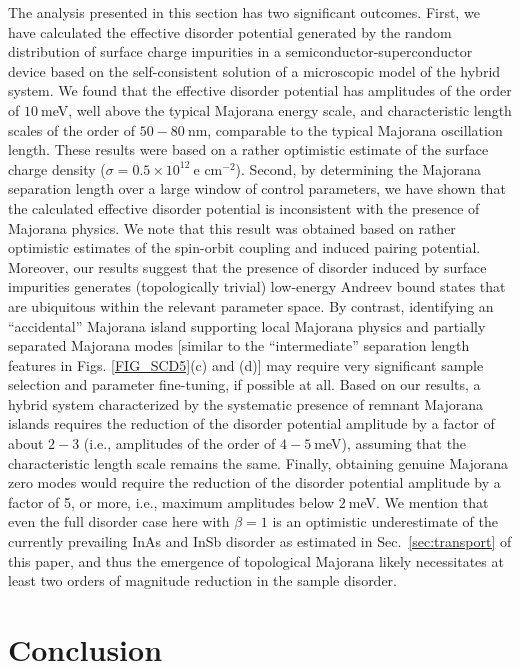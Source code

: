 \documentclass[aps,prmaterials,twocolumn,superscriptaddress,longbibliography]{revtex4-2}
\begin{document}
The analysis presented in this section has two significant outcomes. First, we have calculated the effective disorder potential generated by the random distribution of surface charge impurities in a semiconductor-superconductor device based on the self-consistent solution of a microscopic model of the hybrid system. We found that the effective disorder potential has amplitudes of the order of $10~$meV, well above the typical Majorana energy scale, and characteristic length scales of the order of $50-80~$nm, comparable to the typical Majorana oscillation length. These results were based on a rather optimistic estimate of the surface charge density ($\sigma = 0.5 \times 10^{12}~\text{e cm}^{-2}$). Second, by determining the Majorana separation length over a large window of control parameters, we have shown that the calculated effective disorder potential is inconsistent with the presence of Majorana physics. We note that this result was obtained based on rather optimistic estimates of the spin-orbit coupling and induced pairing potential. Moreover, our results suggest that the presence of disorder induced by surface impurities generates (topologically trivial) low-energy Andreev bound states that are ubiquitous within the relevant parameter space. By contrast, identifying an ``accidental'' Majorana island supporting local Majorana physics and partially separated Majorana modes [similar to the ``intermediate'' separation length features in Figs. \ref{FIG_SCD5}(c) and (d)] may require very significant sample selection and parameter fine-tuning, if possible at all. Based on our results, a hybrid system characterized by the systematic presence of remnant Majorana islands requires the reduction of the disorder potential amplitude by a factor of about $2-3$ (i.e., amplitudes of the order of $4-5~$meV), assuming that the characteristic length scale remains the same. Finally, obtaining genuine Majorana zero modes would require the reduction of the disorder potential amplitude by a factor of 5, or more, i.e., maximum amplitudes below $2~$meV. We mention that even the full disorder case here with $\beta=1$  is an optimistic underestimate of the currently prevailing InAs and InSb disorder as estimated in Sec.~\ref{sec:transport} of this paper, and thus the emergence of topological Majorana likely necessitates at least two orders of magnitude reduction in the sample disorder.


\section{Conclusion}\label{sec:conclusion}
\end{document}
